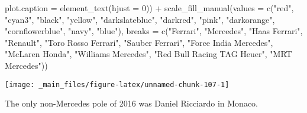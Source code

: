 \documentclass[
]{book}
\newenvironment{Shaded}{\begin{snugshade}}{\end{snugshade}}
\newcommand{\AttributeTok}[1]{\textcolor[rgb]{0.77,0.63,0.00}{#1}}
\newcommand{\DecValTok}[1]{\textcolor[rgb]{0.00,0.00,0.81}{#1}}
\newcommand{\FunctionTok}[1]{\textcolor[rgb]{0.00,0.00,0.00}{#1}}
\newcommand{\NormalTok}[1]{#1}
\newcommand{\SpecialCharTok}[1]{\textcolor[rgb]{0.00,0.00,0.00}{#1}}
\newcommand{\StringTok}[1]{\textcolor[rgb]{0.31,0.60,0.02}{#1}}
\begin{document}
\begin{Shaded}
\begin{Highlighting}[]
        \AttributeTok{plot.caption =} \FunctionTok{element\_text}\NormalTok{(}\AttributeTok{hjust =} \DecValTok{0}\NormalTok{)) }\SpecialCharTok{+}
  \FunctionTok{scale\_fill\_manual}\NormalTok{(}\AttributeTok{values =} \FunctionTok{c}\NormalTok{(}\StringTok{"red"}\NormalTok{, }
                                \StringTok{"cyan3"}\NormalTok{,  }
                                \StringTok{"black"}\NormalTok{, }
                                \StringTok{"yellow"}\NormalTok{,}
                               \StringTok{"darkslateblue"}\NormalTok{, }
                                \StringTok{"darkred"}\NormalTok{,  }
                                \StringTok{"pink"}\NormalTok{, }
                                \StringTok{"darkorange"}\NormalTok{, }
                                \StringTok{"cornflowerblue"}\NormalTok{,}
                               \StringTok{"navy"}\NormalTok{,}
                               \StringTok{"blue"}\NormalTok{),}
                     \AttributeTok{breaks =} \FunctionTok{c}\NormalTok{(}\StringTok{"Ferrari"}\NormalTok{,}
                                 \StringTok{"Mercedes"}\NormalTok{,}
                                 \StringTok{"Haas Ferrari"}\NormalTok{,}
                                 \StringTok{"Renault"}\NormalTok{,}
                                 \StringTok{"Toro Rosso Ferrari"}\NormalTok{,}
                                 \StringTok{"Sauber Ferrari"}\NormalTok{, }
                                 \StringTok{"Force India Mercedes"}\NormalTok{,}
                                 \StringTok{"McLaren Honda"}\NormalTok{,}
                                 \StringTok{"Williams Mercedes"}\NormalTok{,}
                                 \StringTok{"Red Bull Racing TAG Heuer"}\NormalTok{,}
                                \StringTok{"MRT Mercedes"}\NormalTok{))}
\end{Highlighting}
\end{Shaded}

\begin{center}\texttt{[image: \_main\_files/figure-latex/unnamed-chunk-107-1]} \end{center}

The only non-Mercedes pole of 2016 was Daniel Ricciardo in Monaco.
\end{document}
